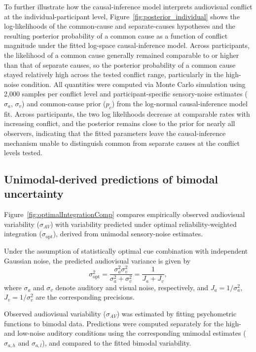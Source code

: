 \documentclass[9pt,lineno,doublespacing]{elife}
\begin{document}
To further illustrate how the causal-inference model interprets audiovisual conflict at the individual-participant level, Figure~\ref{fig:posterior_individual} shows the log-likelihoods of the common-cause and separate-causes hypotheses and the resulting posterior probability of a common cause as a function of conflict magnitude under the fitted log-space causal-inference model. Across participants, the likelihood of a common cause generally remained comparable to or higher than that of separate causes, so the posterior probability of a common cause stayed relatively high across the tested conflict range, particularly in the high-noise condition. All quantities were computed via Monte Carlo simulation using 2,000 samples per conflict level and participant-specific sensory-noise estimates ($\sigma_a$, $\sigma_v$) and common-cause prior ($p_c$) from the log-normal causal-inference model fit. Across participants, the two log likelihoods decrease at comparable rates with increasing conflict, and the posterior remains close to the prior for nearly all observers, indicating that the fitted parameters leave the causal-inference mechanism unable to distinguish common from separate causes at the conflict levels tested.


\subsection{Unimodal-derived predictions of bimodal uncertainty}

Figure~\ref{fig:optimalIntegrationComp} compares empirically observed audiovisual variability ($\sigma_{AV}$) with variability predicted under optimal reliability-weighted integration ($\sigma_{\mathrm{opt}}$), derived from unimodal sensory-noise estimates. 

Under the assumption of statistically optimal cue combination with independent Gaussian noise, the predicted audiovisual variance is given by
\begin{equation}
\sigma_{\mathrm{opt}}^2 = \frac{\sigma_a^2 \sigma_v^2}{\sigma_a^2 + \sigma_v^2}
= \frac{1}{J_a + J_v},
\end{equation}
where $\sigma_a$ and $\sigma_v$ denote auditory and visual noise, respectively, and $J_a = 1/\sigma_a^2$, $J_v = 1/\sigma_v^2$ are the corresponding precisions.

Observed audiovisual variability ($\sigma_{AV}$) was estimated by fitting psychometric functions to bimodal data. Predictions were computed separately for the high- and low-noise auditory conditions using the corresponding unimodal estimates ($\sigma_{a,h}$ and $\sigma_{a,l}$), and compared to the fitted bimodal variability.
\end{document}
